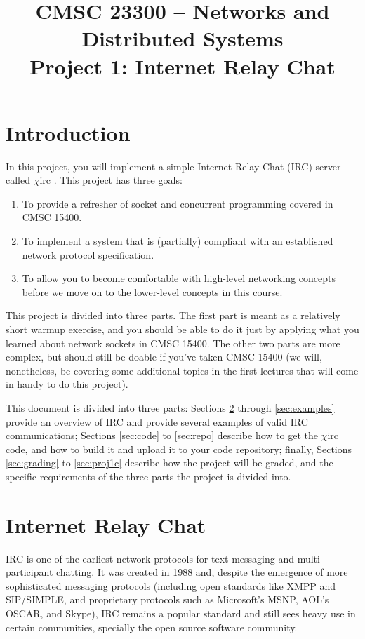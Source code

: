 \documentclass[10pt]{article}
\title{CMSC 23300 -- Networks and Distributed Systems\\{\large Project 1: Internet Relay Chat}}
\date{}
\newcommand{\chirc}{$\chi$\textsf{irc} }
\begin{document}
\pagestyle{empty}
\maketitle

\section{Introduction}

In this project, you will implement a simple Internet Relay Chat (IRC) server called \chirc. This project has three goals:

\begin{enumerate}
 \item To provide a refresher of socket and concurrent programming covered in CMSC 15400.
 \item To implement a system that is (partially) compliant with an established network protocol specification.
 \item To allow you to become comfortable with high-level networking concepts before we move on to the lower-level concepts in this course.
\end{enumerate}

This project is divided into three parts. The first part is meant as a relatively short warmup exercise, and you should be able to do it just by applying what you learned about network sockets in CMSC 15400. The other two parts are more complex, but should still be doable if you've taken CMSC 15400 (we will, nonetheless, be covering some additional topics in the first lectures that will come in handy to do this project).

This document is divided into three parts: Sections \ref{sec:irc} through \ref{sec:examples} provide an overview of IRC and provide several examples of valid IRC communications; Sections \ref{sec:code} to \ref{sec:repo} describe how to get the \chirc code, and how to build it and upload it to your code repository; finally, Sections \ref{sec:grading} to \ref{sec:proj1c} describe how the project will be graded, and the specific requirements of the three parts the project is divided into.

\section{Internet Relay Chat}
\label{sec:irc}

IRC is one of the earliest network protocols for text messaging and multi-participant chatting. It was created in 1988 and, despite the emergence of more sophisticated messaging protocols (including open standards like XMPP and SIP/SIMPLE, and proprietary protocols such as Microsoft's MSNP, AOL's OSCAR, and Skype), IRC remains a popular standard and still sees heavy use in certain communities, specially the open source software community.
\end{document}
